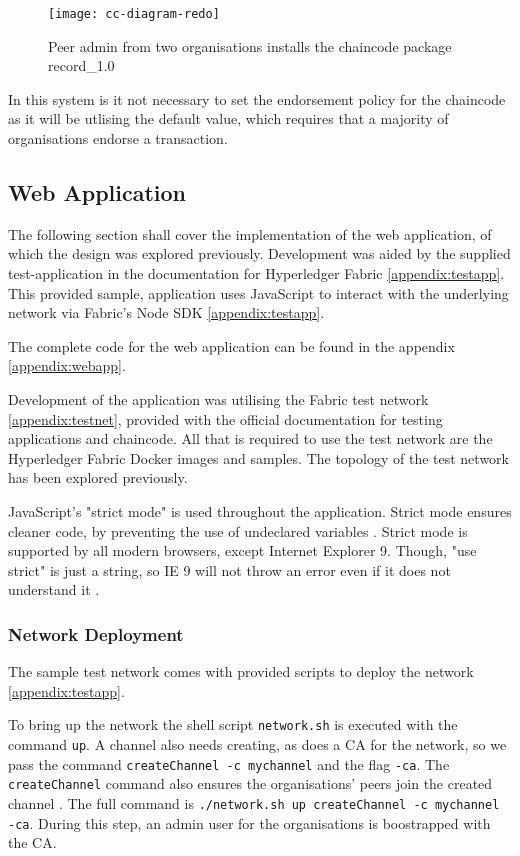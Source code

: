 \begin{figure}[H]
  \texttt{[image: cc-diagram-redo]}
  \caption{Peer admin from two organisations installs the chaincode package record\_1.0}
\end{figure}

In this system is it not necessary to set the endorsement policy for the chaincode as it will be utlising the default value, which requires that a majority of organisations endorse a transaction. \cite{noauthor_fabric_nodate}


\subsection{Web Application}
The following section shall cover the implementation of the web application, of which the design was explored previously. 
Development was aided by the supplied test-application in the documentation for Hyperledger Fabric \ref{appendix:testapp}.
This provided sample, application uses JavaScript to interact with the underlying network via Fabric's Node SDK \ref{appendix:testapp}.

The complete code for the web application can be found in the appendix \ref{appendix:webapp}.

Development of the application was utilising the Fabric test network \ref{appendix:testnet}, provided with the official documentation for testing applications and chaincode.
All that is required to use the test network are the Hyperledger Fabric Docker images and samples. \cite{noauthor_using_nodate}
The topology of the test network has been explored previously. 

JavaScript's "strict mode" is used throughout the application. 
Strict mode ensures cleaner code, by preventing the use of undeclared variables \cite{noauthor_referenceerror_nodate}. 
Strict mode is supported by all modern browsers, except Internet Explorer 9. Though, "use strict" is just a string, so IE 9 will not throw an error even if it does not understand it \cite{noauthor_javascript_nodate}.

\subsubsection{Network Deployment}
The sample test network comes with provided scripts to deploy the network \ref{appendix:testapp}. 

To bring up the network the shell script \lstinline{network.sh} is executed with the command \lstinline{up}. 
A channel also needs creating, as does a CA for the network, so we pass the command \lstinline{createChannel -c mychannel} and the flag \lstinline{-ca}. 
The \lstinline{createChannel} command also ensures the organisations' peers join the created channel \cite{noauthor_using_nodate}.
The full command is \lstinline{./network.sh up createChannel -c mychannel -ca}.
During this step, an admin user for the organisations is boostrapped with the CA.  


